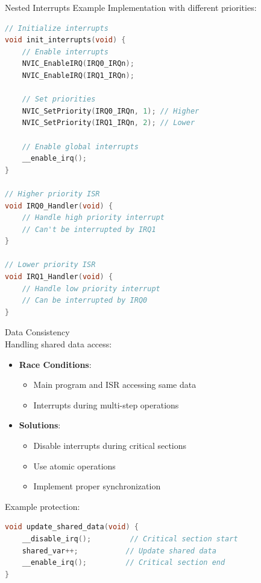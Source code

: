 \begin{example2}{Nested Interrupts Example}
Implementation with different priorities:
\begin{lstlisting}[language=C, style=base]
// Initialize interrupts
void init_interrupts(void) {
    // Enable interrupts
    NVIC_EnableIRQ(IRQ0_IRQn);
    NVIC_EnableIRQ(IRQ1_IRQn);
    
    // Set priorities
    NVIC_SetPriority(IRQ0_IRQn, 1); // Higher
    NVIC_SetPriority(IRQ1_IRQn, 2); // Lower
    
    // Enable global interrupts
    __enable_irq();
}

// Higher priority ISR
void IRQ0_Handler(void) {
    // Handle high priority interrupt
    // Can't be interrupted by IRQ1
}

// Lower priority ISR
void IRQ1_Handler(void) {
    // Handle low priority interrupt
    // Can be interrupted by IRQ0
}
\end{lstlisting}
\end{example2}

\begin{concept}{Data Consistency}\\
Handling shared data access:
\begin{itemize}
  \item \textbf{Race Conditions}:
    \begin{itemize}
      \item Main program and ISR accessing same data
      \item Interrupts during multi-step operations
    \end{itemize}
  \item \textbf{Solutions}:
    \begin{itemize}
      \item Disable interrupts during critical sections
      \item Use atomic operations
      \item Implement proper synchronization
    \end{itemize}
\end{itemize}

Example protection:
\begin{lstlisting}[language=C, style=base]
void update_shared_data(void) {
    __disable_irq();         // Critical section start
    shared_var++;           // Update shared data
    __enable_irq();         // Critical section end
}
\end{lstlisting}
\end{concept}

